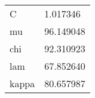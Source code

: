 \begin{tabular}{ll}
C & 1.017346\\
mu & 96.149048\\
chi & 92.310923\\
lam & 67.852640\\
kappa & 80.657987\\
\end{tabular}
